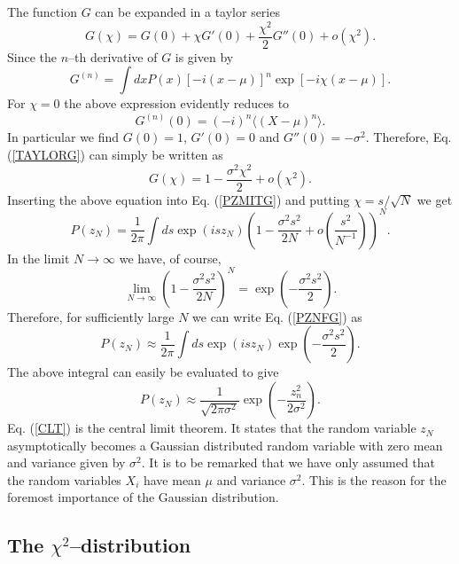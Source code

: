 The function $G$ can be expanded in a taylor series
\begin{equation}\label{TAYLORG}
G(\chi) = G(0) + \chi G'(0) + \frac{\chi^2}{2} G''(0) + o(\chi^2).
\end{equation}
Since the $n$--th derivative of $G$ is given by
\begin{equation}
G^{(n)} = \int dx P(x) [-i(x-\mu)]^n \exp[-i\chi(x-\mu)].
\end{equation}
For $\chi=0$ the above expression evidently reduces to
\begin{equation}
G^{(n)}(0) = (-i)^n \langle (X-\mu)^n\rangle.
\end{equation}
In particular we find $G(0) =1$, $G'(0)= 0$ and $G''(0) = 
-\sigma^2$.
Therefore, Eq. (\ref{TAYLORG}) can simply be written as
\begin{equation}
G(\chi) = 1 - \frac{\sigma^2\chi^2}{2} + o(\chi^2).
\end{equation}
Inserting the above equation into Eq. (\ref{PZMITG}) 
and putting $\chi=s/{\sqrt{N}}$ we get
\begin{equation}\label{PZNFG}
P(z_N) = \frac{1}{2\pi} \int ds \exp(isz_N)
   \left( 1- \frac{\sigma^2s^2}{2N} + 
   o(\frac{s^2}{N^{-1}})\right)^N.
\end{equation}
In the limit $N\rightarrow \infty$ we have, of course,
\begin{equation}
\lim_{N\rightarrow \infty} \left( 1 - 
\frac{\sigma^2s^2}{2N}\right)^N = \exp(-\frac{\sigma^2 s^2}{2}).
\end{equation}
Therefore, for sufficiently large $N$ we can write Eq. (\ref{PZNFG}) 
as
\begin{equation}
P(z_N) \approx \frac{1}{2\pi} \int ds \exp(isz_N)
      \exp(-\frac{\sigma^2s^2}{2}).
\end{equation}
The above integral can easily be evaluated to give
\begin{equation} \label{CLT}
P(z_N) \approx \frac{1}{\sqrt{2\pi \sigma^2}} 
    \exp(-\frac{z_n^2}{2 \sigma^2}).
\end{equation}
Eq. (\ref{CLT}) is the central limit theorem. It states that the 
random variable $z_N$ asymptotically becomes a Gaussian distributed
random variable with zero mean and variance given by $\sigma^2$.
It is to be remarked that we have only assumed that the random 
variables $X_i$ have mean $\mu$ and variance $\sigma^2$. This is 
the reason for the foremost importance of the Gaussian 
distribution.

\subsection{The $\chi^2$--distribution}

